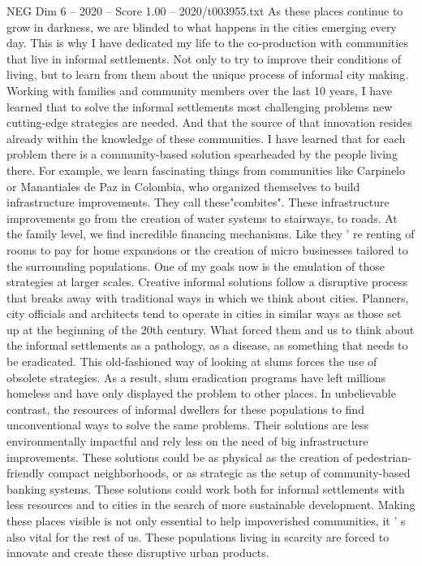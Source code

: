 \begin{textsample}{NEG Dim 6 – 2020 – Score 1.00 – 2020/t003955.txt}
As these places continue to grow in darkness, we are blinded to what happens in the cities emerging every day.
This is why I have dedicated my life to the co-production with communities that live in informal settlements.
Not only to try to improve their conditions of living, but to learn from them about the unique process of informal city making.
Working with families and community members over the last 10 years, I have learned that to solve the informal settlements most challenging problems new cutting-edge strategies are needed.
And that the source of that innovation resides already within the knowledge of these communities.
I have learned that for each problem there is a community-based solution spearheaded by the people living there.
For example, we learn fascinating things from communities like Carpinelo or Manantiales de Paz in Colombia, who organized themselves to build infrastructure improvements.
They call these"combites".
These infrastructure improvements go from the creation of water systems to stairways, to roads.
At the family level, we find incredible financing mechanisms.
Like they ' re renting of rooms to pay for home expansions or the creation of micro businesses tailored to the surrounding populations.
One of my goals now is the emulation of those strategies at larger scales.
Creative informal solutions follow a disruptive process that breaks away with traditional ways in which we think about cities.
Planners, city officials and architects tend to operate in cities in similar ways as those set up at the beginning of the 20th century.
What forced them and us to think about the informal settlements as a pathology, as a disease, as something that needs to be eradicated.
This old-fashioned way of looking at slums forces the use of obsolete strategies.
As a result, slum eradication programs have left millions homeless and have only displayed the problem to other places.
In unbelievable contrast, the resources of informal dwellers for these populations to find unconventional ways to solve the same problems.
Their solutions are less environmentally impactful and rely less on the need of big infrastructure improvements.
These solutions could be as physical as the creation of pedestrian-friendly compact neighborhoods, or as strategic as the setup of community-based banking systems.
These solutions could work both for informal settlements with less resources and to cities in the search of more sustainable development.
Making these places visible is not only essential to help impoverished communities, it ' s also vital for the rest of us.
These populations living in scarcity are forced to innovate and create these disruptive urban products.

\end{textsample}
